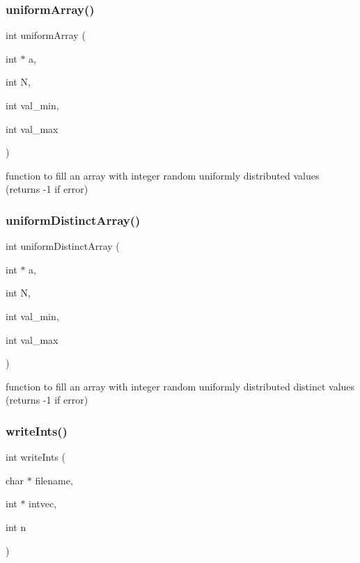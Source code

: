 \subsubsection{uniform\+Array()}
{\footnotesize\ttfamily int uniform\+Array (\begin{DoxyParamCaption}\item[{int $\ast$}]{a,  }\item[{int}]{N,  }\item[{int}]{val\+\_\+min,  }\item[{int}]{val\+\_\+max }\end{DoxyParamCaption})}



function to fill an array with integer random uniformly distributed values (returns -\/1 if error) 

\label{lib__util_8c_abe28a8d01e728c45f8f7025b78854bc1} 
\subsubsection{uniform\+Distinct\+Array()}
{\footnotesize\ttfamily int uniform\+Distinct\+Array (\begin{DoxyParamCaption}\item[{int $\ast$}]{a,  }\item[{int}]{N,  }\item[{int}]{val\+\_\+min,  }\item[{int}]{val\+\_\+max }\end{DoxyParamCaption})}



function to fill an array with integer random uniformly distributed distinct values (returns -\/1 if error) 

\label{lib__util_8c_ad9f5d69c08f2a8d2adf8531b101c6b1c} 
\subsubsection{write\+Ints()}
{\footnotesize\ttfamily int write\+Ints (\begin{DoxyParamCaption}\item[{char $\ast$}]{filename,  }\item[{int $\ast$}]{intvec,  }\item[{int}]{n }\end{DoxyParamCaption})}

